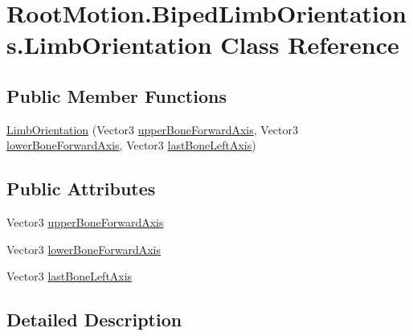 \hypertarget{class_root_motion_1_1_biped_limb_orientations_1_1_limb_orientation}{}\section{Root\+Motion.\+Biped\+Limb\+Orientations.\+Limb\+Orientation Class Reference}
\label{class_root_motion_1_1_biped_limb_orientations_1_1_limb_orientation}
\subsection*{Public Member Functions}
\begin{DoxyCompactItemize}
\item 
\mbox{\hyperlink{class_root_motion_1_1_biped_limb_orientations_1_1_limb_orientation_a46ed87f991d8c61145fa07c63714971f}{Limb\+Orientation}} (Vector3 \mbox{\hyperlink{class_root_motion_1_1_biped_limb_orientations_1_1_limb_orientation_a885c8197a74dfe72c4fbec18070201b6}{upper\+Bone\+Forward\+Axis}}, Vector3 \mbox{\hyperlink{class_root_motion_1_1_biped_limb_orientations_1_1_limb_orientation_a63ada7fad803287f5d2745c2c86b773d}{lower\+Bone\+Forward\+Axis}}, Vector3 \mbox{\hyperlink{class_root_motion_1_1_biped_limb_orientations_1_1_limb_orientation_af788bb8b4d76ce84865fbdc8eefb06db}{last\+Bone\+Left\+Axis}})
\end{DoxyCompactItemize}
\subsection*{Public Attributes}
\begin{DoxyCompactItemize}
\item 
Vector3 \mbox{\hyperlink{class_root_motion_1_1_biped_limb_orientations_1_1_limb_orientation_a885c8197a74dfe72c4fbec18070201b6}{upper\+Bone\+Forward\+Axis}}
\item 
Vector3 \mbox{\hyperlink{class_root_motion_1_1_biped_limb_orientations_1_1_limb_orientation_a63ada7fad803287f5d2745c2c86b773d}{lower\+Bone\+Forward\+Axis}}
\item 
Vector3 \mbox{\hyperlink{class_root_motion_1_1_biped_limb_orientations_1_1_limb_orientation_af788bb8b4d76ce84865fbdc8eefb06db}{last\+Bone\+Left\+Axis}}
\end{DoxyCompactItemize}


\subsection{Detailed Description}


